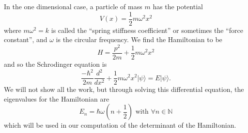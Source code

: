 In the one dimensional case, a particle of mass $m$ has the potential
\begin{equation}
V(x) = \frac{1}{2}m\omega^2x^2
\end{equation}
where $m\omega^2=k$ is called the ``spring stiffness coefficient'' or sometimes the ``force constant'', and $\omega$ is the circular frequency. We find the Hamiltonian to be
\begin{equation}
H = \frac{p^2}{2m} + \frac{1}{2}m\omega^2x^2
\end{equation}
and so the Schrodinger equation is
\begin{equation}
\frac{-\hbar^2}{2m}\frac{d^2}{dx^2} + \frac{1}{2}m\omega^2x^2 |\psi\rangle = E |\psi\rangle.
\end{equation}
We will not show all the work, but through solving this differential equation, the eigenvalues for the Hamiltonian are
\begin{equation}
E_{n} = \hbar\omega(n + \frac{1}{2}) \mbox{    with    }\forall n\in\mathbb{N}
\end{equation}
which will be used in our computation of the determinant of the Hamiltonian.

